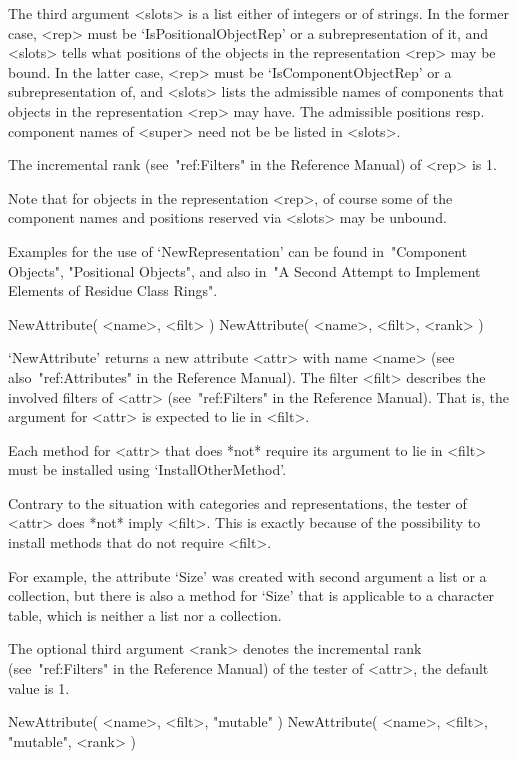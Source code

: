 The third argument <slots> is a list either of integers or of strings.
In the former case, <rep> must be `IsPositionalObjectRep' or a
subrepresentation of it, and <slots> tells what positions of the objects
in the representation <rep> may be bound.
In the latter case, <rep> must be `IsComponentObjectRep' or a
subrepresentation of, and <slots> lists the admissible names of
components that objects in the representation <rep> may have.
The admissible positions resp. component names of <super> need not be
be listed in <slots>.

The incremental rank (see~"ref:Filters" in the Reference Manual)
of <rep> is 1.

Note that for objects in the representation <rep>,
of course some of the component names and positions reserved via <slots>
may be unbound.

Examples for the use of `NewRepresentation' can be found
in~"Component Objects", "Positional Objects", and also
in~"A Second Attempt to Implement Elements of Residue Class Rings".



\>NewAttribute( <name>, <filt> )
\)NewAttribute( <name>, <filt>, <rank> )

`NewAttribute' returns a new attribute <attr> with name <name>
(see also~"ref:Attributes" in the Reference Manual).
The filter <filt> describes the involved filters of <attr>
(see~"ref:Filters" in the Reference Manual).
That is, the argument for <attr> is expected to lie in <filt>.

Each method for <attr> that does *not* require its argument to lie
in <filt> must be installed using `InstallOtherMethod'.

Contrary to the situation with categories and representations,
the tester of <attr> does *not* imply <filt>.
This is exactly because of the possibility to install methods
that do not require <filt>.

For example, the attribute `Size' was created with second argument
a list or a collection,
but there is also a method for `Size' that is applicable to
a character table, which is neither a list nor a collection.

The optional third argument <rank> denotes the incremental rank
(see~"ref:Filters" in the Reference Manual) of the tester of <attr>,
the default value is 1.

\>NewAttribute( <name>, <filt>, "mutable" )
\)NewAttribute( <name>, <filt>, "mutable", <rank> )

